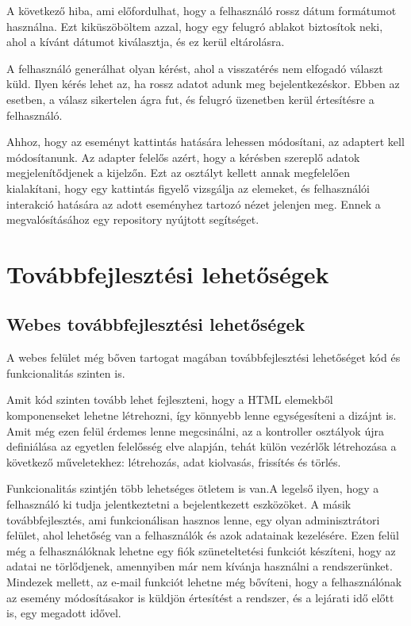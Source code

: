 \documentclass[
]{thesis-ekf}
\theoremstyle{definition}
\theoremstyle{remark}
\begin{document}
	A következő hiba, ami előfordulhat, hogy a felhasználó rossz dátum formátumot használna. Ezt kiküszöböltem azzal, hogy egy felugró ablakot biztosítok neki, ahol a kívánt dátumot kiválasztja, és ez kerül eltárolásra. 
	
	A felhasználó generálhat olyan kérést, ahol a visszatérés nem elfogadó választ küld. Ilyen kérés lehet az, ha rossz adatot adunk meg bejelentkezéskor. Ebben az esetben, a válasz sikertelen ágra fut, és felugró üzenetben kerül értesítésre a felhasználó. 
	
	Ahhoz, hogy az eseményt kattintás hatására lehessen módosítani, az adaptert kell módosítanunk. Az adapter felelős azért, hogy a kérésben szereplő adatok megjelenítődjenek a kijelzőn. Ezt az osztályt kellett annak megfelelően kialakítani, hogy egy kattintás figyelő vizsgálja az elemeket, és felhasználói interakció hatására az adott eseményhez tartozó nézet jelenjen meg. Ennek a megvalósításához egy repository nyújtott segítséget.~\cite{recview_onclick} 
	
	\chapter{Továbbfejlesztési lehetőségek}
	\section{Webes továbbfejlesztési lehetőségek}
	A webes felület még bőven tartogat magában továbbfejlesztési lehetőséget kód és funkcionalitás szinten is. 
	
	Amit kód szinten tovább lehet fejleszteni, hogy a HTML elemekből komponenseket lehetne létrehozni, így könnyebb lenne egységesíteni a dizájnt is. Amit még ezen felül érdemes lenne megcsinálni, az a kontroller osztályok újra definiálása az egyetlen felelősség elve alapján, tehát külön vezérlők létrehozása a következő műveletekhez: létrehozás, adat kiolvasás, frissítés és törlés. 
	
	Funkcionalitás szintjén több lehetséges ötletem is van.A legelső ilyen, hogy a felhasználó ki tudja jelentkeztetni a bejelentkezett eszközöket. A másik továbbfejlesztés, ami funkcionálisan hasznos lenne, egy olyan adminisztrátori felület, ahol lehetőség van a felhasználók és azok adatainak kezelésére. Ezen felül még a felhasználóknak lehetne egy fiók szüneteltetési funkciót készíteni, hogy az adatai ne törlődjenek, amennyiben már nem kívánja használni a rendszerünket. Mindezek mellett, az e-mail funkciót lehetne még bővíteni, hogy a felhasználónak az esemény módosításakor is küldjön értesítést a rendszer, és a lejárati idő előtt is, egy megadott idővel.
	
\end{document}
